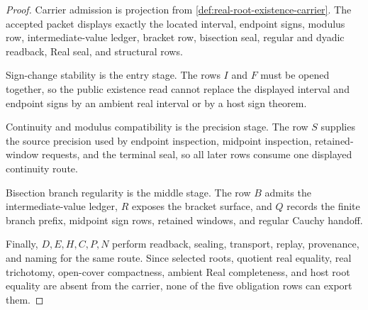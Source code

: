 \begin{proof}
Carrier admission is projection from \autoref{def:real-root-existence-carrier}. The accepted packet displays exactly the located interval, endpoint signs, modulus row, intermediate-value ledger, bracket row, bisection seal, regular and dyadic readback, Real seal, and structural rows.

Sign-change stability is the entry stage. The rows $I$ and $F$ must be opened together, so the public existence read cannot replace the displayed interval and endpoint signs by an ambient real interval or by a host sign theorem.

Continuity and modulus compatibility is the precision stage. The row $S$ supplies the source precision used by endpoint inspection, midpoint inspection, retained-window requests, and the terminal seal, so all later rows consume one displayed continuity route.

Bisection branch regularity is the middle stage. The row $B$ admits the intermediate-value ledger, $R$ exposes the bracket surface, and $Q$ records the finite branch prefix, midpoint sign rows, retained windows, and regular Cauchy handoff.

Finally, $D,E,H,C,P,N$ perform readback, sealing, transport, replay, provenance, and naming for the same route. Since selected roots, quotient real equality, real trichotomy, open-cover compactness, ambient Real completeness, and host root equality are absent from the carrier, none of the five obligation rows can export them.
\end{proof}

